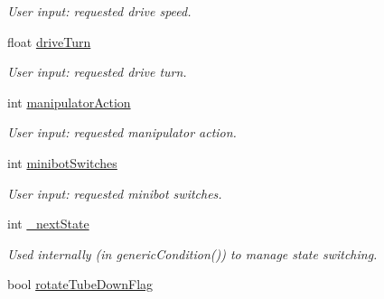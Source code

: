 \begin{DoxyCompactItemize}
\begin{DoxyCompactList}\small\item\em User input: requested drive speed. \item\end{DoxyCompactList}\item 
\hypertarget{class_r_j_f_r_c2011_1_1_teleoperated_ab02ce438620ef99634fce0e0fc179f03}{
float \hyperlink{class_r_j_f_r_c2011_1_1_teleoperated_ab02ce438620ef99634fce0e0fc179f03}{driveTurn}}
\label{class_r_j_f_r_c2011_1_1_teleoperated_ab02ce438620ef99634fce0e0fc179f03}

\begin{DoxyCompactList}\small\item\em User input: requested drive turn. \item\end{DoxyCompactList}\item 
\hypertarget{class_r_j_f_r_c2011_1_1_teleoperated_a2b7b8b3c8b0d624cebf0c54ebb37d29b}{
int \hyperlink{class_r_j_f_r_c2011_1_1_teleoperated_a2b7b8b3c8b0d624cebf0c54ebb37d29b}{manipulatorAction}}
\label{class_r_j_f_r_c2011_1_1_teleoperated_a2b7b8b3c8b0d624cebf0c54ebb37d29b}

\begin{DoxyCompactList}\small\item\em User input: requested manipulator action. \item\end{DoxyCompactList}\item 
\hypertarget{class_r_j_f_r_c2011_1_1_teleoperated_a023135ea35f7f6b4f8c2b0dbc3e6f05b}{
int \hyperlink{class_r_j_f_r_c2011_1_1_teleoperated_a023135ea35f7f6b4f8c2b0dbc3e6f05b}{minibotSwitches}}
\label{class_r_j_f_r_c2011_1_1_teleoperated_a023135ea35f7f6b4f8c2b0dbc3e6f05b}

\begin{DoxyCompactList}\small\item\em User input: requested minibot switches. \item\end{DoxyCompactList}\item 
\hypertarget{class_r_j_f_r_c2011_1_1_teleoperated_a217182074fc75594390b0fab99e9727b}{
int \hyperlink{class_r_j_f_r_c2011_1_1_teleoperated_a217182074fc75594390b0fab99e9727b}{\_\-nextState}}
\label{class_r_j_f_r_c2011_1_1_teleoperated_a217182074fc75594390b0fab99e9727b}

\begin{DoxyCompactList}\small\item\em Used internally (in {\itshape genericCondition()\/}) to manage state switching. \item\end{DoxyCompactList}\item 
\hypertarget{class_r_j_f_r_c2011_1_1_teleoperated_a0ea34db9b495f0d0f4d03ea710a46aa1}{
bool \hyperlink{class_r_j_f_r_c2011_1_1_teleoperated_a0ea34db9b495f0d0f4d03ea710a46aa1}{rotateTubeDownFlag}}
\label{class_r_j_f_r_c2011_1_1_teleoperated_a0ea34db9b495f0d0f4d03ea710a46aa1}


\end{DoxyCompactItemize}
